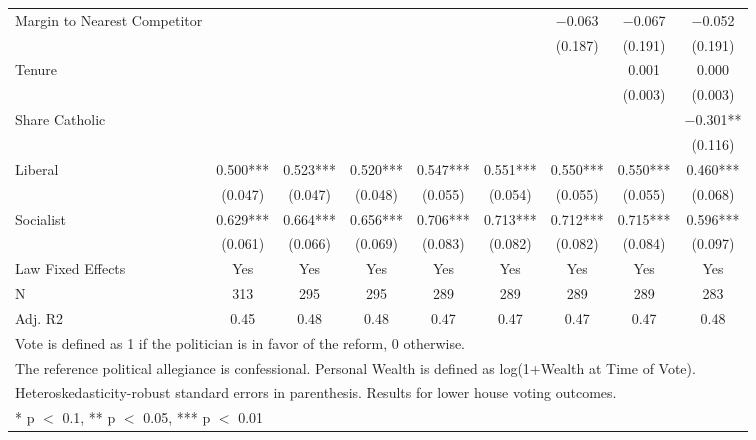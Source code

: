 \begin{table}
\begin{tabular}[t]{lcccccccc}
Margin to Nearest Competitor &  &  &  &  &  & \num{-0.063} & \num{-0.067} & \num{-0.052}\\
 &  &  &  &  &  & (\num{0.187}) & (\num{0.191}) & (\num{0.191})\\
Tenure &  &  &  &  &  &  & \num{0.001} & \num{0.000}\\
 &  &  &  &  &  &  & (\num{0.003}) & (\num{0.003})\\
Share Catholic &  &  &  &  &  &  &  & \num{-0.301}**\\
 &  &  &  &  &  &  &  & (\num{0.116})\\
Liberal & \num{0.500}*** & \num{0.523}*** & \num{0.520}*** & \num{0.547}*** & \num{0.551}*** & \num{0.550}*** & \num{0.550}*** & \num{0.460}***\\
 & (\num{0.047}) & (\num{0.047}) & (\num{0.048}) & (\num{0.055}) & (\num{0.054}) & (\num{0.055}) & (\num{0.055}) & (\num{0.068})\\
Socialist & \num{0.629}*** & \num{0.664}*** & \num{0.656}*** & \num{0.706}*** & \num{0.713}*** & \num{0.712}*** & \num{0.715}*** & \num{0.596}***\\
 & (\num{0.061}) & (\num{0.066}) & (\num{0.069}) & (\num{0.083}) & (\num{0.082}) & (\num{0.082}) & (\num{0.084}) & (\num{0.097})\\
\midrule
Law Fixed Effects & Yes & Yes & Yes & Yes & Yes & Yes & Yes & Yes\\
N & \num{313} & \num{295} & \num{295} & \num{289} & \num{289} & \num{289} & \num{289} & \num{283}\\
Adj. R2 & \num{0.45} & \num{0.48} & \num{0.48} & \num{0.47} & \num{0.47} & \num{0.47} & \num{0.47} & \num{0.48}\\
\bottomrule
\multicolumn{9}{l}{\rule{0pt}{1em}Vote is defined as 1 if the politician is in favor of the reform, 0 otherwise.}\\
\multicolumn{9}{l}{\rule{0pt}{1em}The reference political allegiance is confessional. Personal Wealth is defined as log(1+Wealth at Time of Vote).}\\
\multicolumn{9}{l}{\rule{0pt}{1em}Heteroskedasticity-robust standard errors in parenthesis. Results for lower house voting outcomes.}\\
\multicolumn{9}{l}{\rule{0pt}{1em}* p $<$ 0.1, ** p $<$ 0.05, *** p $<$ 0.01}\\
\end{tabular}
\end{table}
